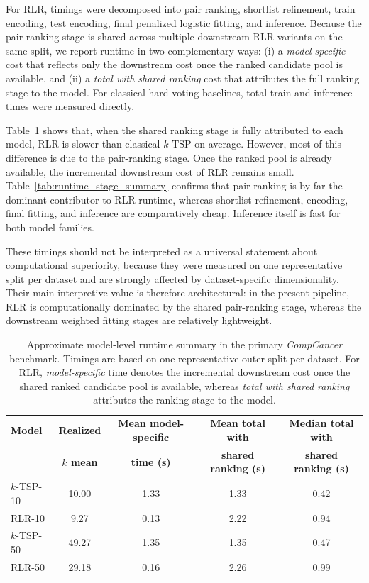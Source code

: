 \documentclass[11pt, a4paper]{article}
\newcommand{\stdtablefont}{\small}
\newcommand{\stdtablelayout}{%
  \stdtablefont
  \setlength{\tabcolsep}{4pt}
  \renewcommand{\arraystretch}{1.2}
}
\begin{document}
For RLR, timings were decomposed into pair ranking, shortlist refinement, train encoding, test encoding, final penalized logistic fitting, and inference. Because the pair-ranking stage is shared across multiple downstream RLR variants on the same split, we report runtime in two complementary ways: (i) a \emph{model-specific} cost that reflects only the downstream cost once the ranked candidate pool is available, and (ii) a \emph{total with shared ranking} cost that attributes the full ranking stage to the model. For classical hard-voting baselines, total train and inference times were measured directly.

Table~\ref{tab:runtime_model_summary} shows that, when the shared ranking stage is fully attributed to each model, RLR is slower than classical $k$-TSP on average. However, most of this difference is due to the pair-ranking stage. Once the ranked pool is already available, the incremental downstream cost of RLR remains small. Table~\ref{tab:runtime_stage_summary} confirms that pair ranking is by far the dominant contributor to RLR runtime, whereas shortlist refinement, encoding, final fitting, and inference are comparatively cheap. Inference itself is fast for both model families.

These timings should not be interpreted as a universal statement about computational superiority, because they were measured on one representative split per dataset and are strongly affected by dataset-specific dimensionality. Their main interpretive value is therefore architectural: in the present pipeline, RLR is computationally dominated by the shared pair-ranking stage, whereas the downstream weighted fitting stages are relatively lightweight.

\begin{table}[!htbp]
\centering
\caption{Approximate model-level runtime summary in the primary \emph{CompCancer} benchmark. Timings are based on one representative outer split per dataset. For RLR, \emph{model-specific} time denotes the incremental downstream cost once the shared ranked candidate pool is available, whereas \emph{total with shared ranking} attributes the ranking stage to the model.}
\label{tab:runtime_model_summary}
{\stdtablelayout
\begin{tabular}{lcccc}
\toprule
\textbf{Model} & \textbf{Realized} & \textbf{Mean model-specific} & \textbf{Mean total with} & \textbf{Median total with} \\
 & \textbf{$k$ mean} & \textbf{time (s)} & \textbf{shared ranking (s)} & \textbf{shared ranking (s)} \\
\midrule
$k$-TSP-10 & 10.00 & 1.33 & 1.33 & 0.42 \\
RLR-10     & 9.27  & 0.13 & 2.22 & 0.94 \\
\midrule
$k$-TSP-50 & 49.27 & 1.35 & 1.35 & 0.47 \\
RLR-50     & 29.18 & 0.16 & 2.26 & 0.99 \\
\bottomrule
\end{tabular}
}
\end{table}
\end{document}
